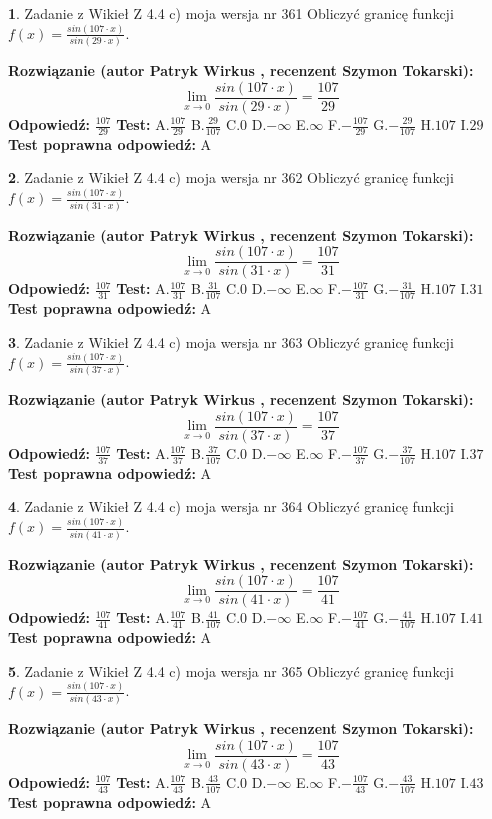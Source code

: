 \documentclass[12pt, a4paper]{article}
\theoremstyle{definition} %
\newtheorem{zad}{}
\newcommand{\zadStart}[1]{\begin{zad}#1\newline}
\newcommand{\zadStop}{\end{zad}}
\newcommand{\rozwStart}[2]{\noindent \textbf{Rozwiązanie (autor #1 , recenzent #2): }\newline}
\newcommand{\rozwStop}{\newline}
\newcommand{\odpStart}{\noindent \textbf{Odpowiedź:}\newline}
\newcommand{\odpStop}{\newline}
\newcommand{\testStart}{\noindent \textbf{Test:}\newline}
\newcommand{\testStop}{\newline}
\newcommand{\kluczStart}{\noindent \textbf{Test poprawna odpowiedź:}\newline}
\newcommand{\kluczStop}{\newline}
\begin{document}
\zadStart{Zadanie z Wikieł Z 4.4 c) moja wersja nr 361}
Obliczyć granicę funkcji $f(x)=\frac{sin(107\cdot x)}{sin(29\cdot x)}$.
\zadStop
\rozwStart{Patryk Wirkus}{Szymon Tokarski}
$$\lim\limits_{x\to 0}\frac{sin(107\cdot x)}{sin(29\cdot x)}=
\frac{107}{29}$$
\rozwStop
\odpStart
$\frac{107}{29}$
\odpStop
\testStart
A.$\frac{107}{29}$
B.$\frac{29}{107}$
C.$0$
D.$-\infty$
E.$\infty$
F.$-\frac{107}{29}$
G.$-\frac{29}{107}$
H.$107$
I.$29$
\testStop
\kluczStart
A
\kluczStop



\zadStart{Zadanie z Wikieł Z 4.4 c) moja wersja nr 362}
Obliczyć granicę funkcji $f(x)=\frac{sin(107\cdot x)}{sin(31\cdot x)}$.
\zadStop
\rozwStart{Patryk Wirkus}{Szymon Tokarski}
$$\lim\limits_{x\to 0}\frac{sin(107\cdot x)}{sin(31\cdot x)}=
\frac{107}{31}$$
\rozwStop
\odpStart
$\frac{107}{31}$
\odpStop
\testStart
A.$\frac{107}{31}$
B.$\frac{31}{107}$
C.$0$
D.$-\infty$
E.$\infty$
F.$-\frac{107}{31}$
G.$-\frac{31}{107}$
H.$107$
I.$31$
\testStop
\kluczStart
A
\kluczStop



\zadStart{Zadanie z Wikieł Z 4.4 c) moja wersja nr 363}
Obliczyć granicę funkcji $f(x)=\frac{sin(107\cdot x)}{sin(37\cdot x)}$.
\zadStop
\rozwStart{Patryk Wirkus}{Szymon Tokarski}
$$\lim\limits_{x\to 0}\frac{sin(107\cdot x)}{sin(37\cdot x)}=
\frac{107}{37}$$
\rozwStop
\odpStart
$\frac{107}{37}$
\odpStop
\testStart
A.$\frac{107}{37}$
B.$\frac{37}{107}$
C.$0$
D.$-\infty$
E.$\infty$
F.$-\frac{107}{37}$
G.$-\frac{37}{107}$
H.$107$
I.$37$
\testStop
\kluczStart
A
\kluczStop



\zadStart{Zadanie z Wikieł Z 4.4 c) moja wersja nr 364}
Obliczyć granicę funkcji $f(x)=\frac{sin(107\cdot x)}{sin(41\cdot x)}$.
\zadStop
\rozwStart{Patryk Wirkus}{Szymon Tokarski}
$$\lim\limits_{x\to 0}\frac{sin(107\cdot x)}{sin(41\cdot x)}=
\frac{107}{41}$$
\rozwStop
\odpStart
$\frac{107}{41}$
\odpStop
\testStart
A.$\frac{107}{41}$
B.$\frac{41}{107}$
C.$0$
D.$-\infty$
E.$\infty$
F.$-\frac{107}{41}$
G.$-\frac{41}{107}$
H.$107$
I.$41$
\testStop
\kluczStart
A
\kluczStop



\zadStart{Zadanie z Wikieł Z 4.4 c) moja wersja nr 365}
Obliczyć granicę funkcji $f(x)=\frac{sin(107\cdot x)}{sin(43\cdot x)}$.
\zadStop
\rozwStart{Patryk Wirkus}{Szymon Tokarski}
$$\lim\limits_{x\to 0}\frac{sin(107\cdot x)}{sin(43\cdot x)}=
\frac{107}{43}$$
\rozwStop
\odpStart
$\frac{107}{43}$
\odpStop
\testStart
A.$\frac{107}{43}$
B.$\frac{43}{107}$
C.$0$
D.$-\infty$
E.$\infty$
F.$-\frac{107}{43}$
G.$-\frac{43}{107}$
H.$107$
I.$43$
\testStop
\kluczStart
A
\kluczStop
\end{document}
